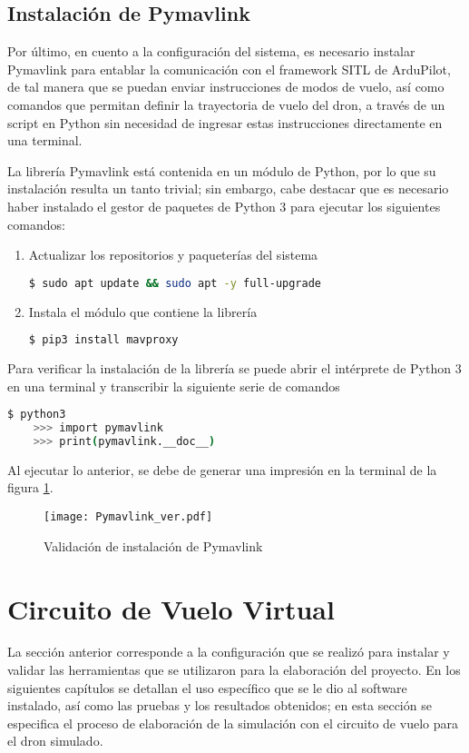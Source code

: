 \subsection{Instalación de Pymavlink}
Por último, en cuento a la configuración del sistema, es necesario instalar Pymavlink para entablar la comunicación con el framework SITL de ArduPilot, de tal manera que se puedan enviar instrucciones de modos de vuelo, así como comandos que permitan definir la trayectoria de vuelo del dron, a través de un script en Python sin necesidad de ingresar estas instrucciones directamente en una terminal.

La librería Pymavlink está contenida en un módulo de Python, por lo que su instalación resulta un tanto trivial; sin embargo, cabe destacar que es necesario haber instalado el gestor de paquetes de Python 3 para ejecutar los siguientes comandos:

\begin{enumerate}
    \item Actualizar los repositorios y paqueterías del sistema
    \begin{lstlisting}[language = bash]
        $ sudo apt update && sudo apt -y full-upgrade
    \end{lstlisting} 
    
    \item Instala el módulo que contiene la librería
    \begin{lstlisting}[language = bash]
        $ pip3 install mavproxy
    \end{lstlisting} 
\end{enumerate}

Para verificar la instalación de la librería se puede abrir el intérprete de Python 3 en una terminal y transcribir la siguiente serie de comandos

\begin{lstlisting}[language = bash]
    $ python3
    >>> import pymavlink
    >>> print(pymavlink.__doc__)
\end{lstlisting} 

Al ejecutar lo anterior, se debe de generar una impresión en la terminal de la figura \ref{fig:Pymavlink_ver}.

\begin{figure}[ht]
    \centering
    \texttt{[image: Pymavlink\_ver.pdf]}
    \caption{Validación de instalación de Pymavlink}
    \label{fig:Pymavlink_ver}
\end{figure}


\section{Circuito de Vuelo Virtual}
La sección anterior corresponde a la configuración que se realizó para instalar y validar las herramientas que se utilizaron para la elaboración del proyecto. En los siguientes capítulos se detallan el uso específico que se le dio al software instalado, así como las pruebas y los resultados obtenidos; en esta sección se especifica el proceso de elaboración de la simulación con el circuito de vuelo para el dron simulado.

